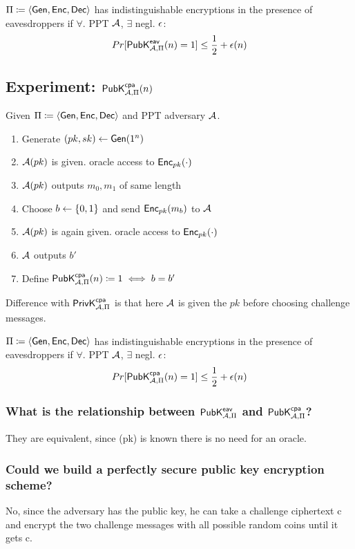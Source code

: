\documentclass[12pt]{article}
\begin{document}
$\Pi \coloneqq \langle \operatorname{\mathsf{Gen}}, \operatorname{\mathsf{Enc}}, \operatorname{\mathsf{Dec}} \rangle$ has indistinguishable encryptions in the presence of eavesdroppers if $\forall$. PPT $\mathcal{A}$, $\exists$ negl. $\epsilon$:
\begin{equation*}
Pr[\mathsf{PubK}_{\mathcal{A},\Pi}^\mathsf{eav}(n)=1] \le \frac12 + \epsilon(n)
\end{equation*}
\newpage

\subsection{Experiment: $\mathsf{PubK}_{\mathcal{A},\Pi}^\mathsf{cpa}(n)$}
Given $\Pi \coloneqq \langle \operatorname{\mathsf{Gen}}, \operatorname{\mathsf{Enc}}, \operatorname{\mathsf{Dec}} \rangle$ and PPT adversary $\mathcal{A}$.
\begin{enumerate}
\item Generate $(pk,sk) \leftarrow \operatorname{\mathsf{Gen}}(1^n)$
\item $\mathcal{A}(pk)$ is given. oracle access to $\operatorname{\mathsf{Enc}}_{pk}(\cdot)$ 
\item $\mathcal{A}(pk)$ outputs $m_0, m_1$ of same length
\item Choose $b\leftarrow \{0, 1\}$ and send $\operatorname{\mathsf{Enc}}_{pk}(m_b)$ to $\mathcal{A}$
\item $\mathcal{A}(pk)$ is again given. oracle access to $\operatorname{\mathsf{Enc}}_{pk}(\cdot)$ 
\item $\mathcal{A}$ outputs $b'$
\item Define $\mathsf{PubK}_{\mathcal{A},\Pi}^\mathsf{cpa}(n)\coloneqq 1 \iff b=b'$
\end{enumerate}
Difference with $\mathsf{PrivK}_{\mathcal{A},\Pi}^\mathsf{cpa}$ is that here $\mathcal{A}$ is given the $pk$ before choosing challenge messages.

$\Pi \coloneqq \langle \operatorname{\mathsf{Gen}}, \operatorname{\mathsf{Enc}}, \operatorname{\mathsf{Dec}} \rangle$ has indistinguishable encryptions in the presence of eavesdroppers if $\forall$. PPT $\mathcal{A}$, $\exists$ negl. $\epsilon$:
\begin{equation*}
Pr[\mathsf{PubK}_{\mathcal{A},\Pi}^\mathsf{cpa}(n)=1] \le \frac12 + \epsilon(n)
\end{equation*}

\subsubsection*{What is the relationship between $\mathsf{PubK}_{\mathcal{A},\Pi}^\mathsf{eav}$ and $\mathsf{PubK}_{\mathcal{A},\Pi}^\mathsf{cpa}$?}
They are equivalent, since (pk) is known there is no need for an oracle.

\subsubsection*{Could we build a perfectly secure public key encryption scheme?}
No, since the adversary has the public key, he can take a challenge ciphertext c and encrypt the two challenge messages with all possible random coins until it gets c.
\end{document}
